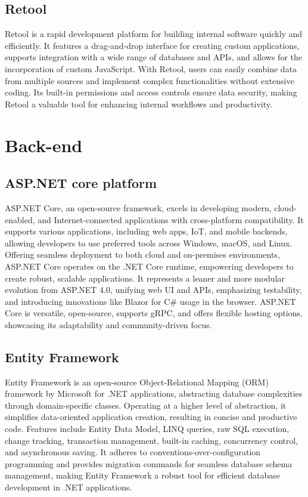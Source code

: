 \subsection{Retool}

Retool is a rapid development platform for building internal software quickly and efficiently. It features a drag-and-drop interface for creating custom applications, supports integration with a wide range of databases and APIs, and allows for the incorporation of custom JavaScript. With Retool, users can easily combine data from multiple sources and implement complex functionalities without extensive coding. Its built-in permissions and access controls ensure data security, making Retool a valuable tool for enhancing internal workflows and productivity.

\section{Back-end}

\subsection{ASP.NET core platform}

ASP.NET Core, an open-source framework, excels in developing modern,
cloud-enabled, and Internet-connected applications with cross-platform
compatibility. It supports various applications, including web apps,
IoT, and mobile backends, allowing developers to use preferred tools
across Windows, macOS, and Linux. Offering seamless deployment to both
cloud and on-premises environments, ASP.NET Core operates on the .NET
Core runtime, empowering developers to create robust, scalable
applications. It represents a leaner and more modular evolution from
ASP.NET 4.0, unifying web UI and APIs, emphasizing testability, and
introducing innovations like Blazor for C\# usage in the browser.
ASP.NET Core is versatile, open-source, supports gRPC, and offers
flexible hosting options, showcasing its adaptability and
community-driven focus.

\subsection{Entity Framework}

Entity Framework is an open-source Object-Relational Mapping (ORM)
framework by Microsoft for .NET applications, abstracting database
complexities through domain-specific classes. Operating at a higher
level of abstraction, it simplifies data-oriented application creation,
resulting in concise and productive code. Features include Entity Data
Model, LINQ queries, raw SQL execution, change tracking, transaction
management, built-in caching, concurrency control, and asynchronous
saving. It adheres to conventions-over-configuration programming and
provides migration commands for seamless database schema management,
making Entity Framework a robust tool for efficient database development
in .NET applications.


